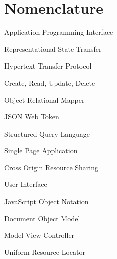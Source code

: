 


\chapter*{Nomenclature}
%

\begin{description}
\item{}   Application Programming Interface
\item{}  Representational State Transfer
\item{}  Hypertext Transfer Protocol
\item{} Create, Read, Update, Delete
\item{}  Object Relational Mapper
\item{}  JSON Web Token
\item{}  Structured Query Language
\item{}  Single Page Application
\item{} Cross Origin Resource Sharing
\item{}   User Interface
\item{} JavaScript Object Notation
\item{}  Document Object Model
\item{}  Model View Controller
\item{}  Uniform Resource Locator
\end{description}
